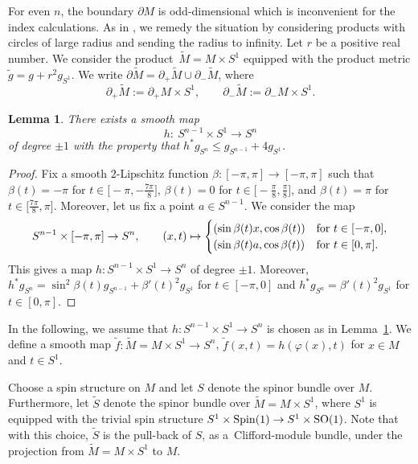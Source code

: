 \documentclass[11pt]{article}
\numberwithin{equation}{section}
\numberwithin{equation}{section}
\newtheorem{Lemma}[Theorem]{Lemma}
\begin{document}
For even $n$, the boundary $\partial M$ is odd-dimensional which is inconvenient for the index calculations.
As in \cite{Llarull}, we remedy the situation by considering products with circles of large radius and sending the radius to infinity.
Let $r$ be a positive real number. We consider the product~${\tilde{M} = M \times S^1}$ equipped with the product metric $\tilde{g} = g + r^2 g_{S^1}$. We write $\partial \tilde{M} = \partial_+ \tilde{M} \cup \partial_- \tilde{M}$, where
\[\partial_+ \tilde{M} := \partial_+ M \times S^1, \qquad \partial_- \tilde{M} := \partial_- M \times S^1.\]

\begin{Lemma} \label{map_to_Sn}
There exists a smooth map
\begin{equation*}
 h\colon\ S^{n-1} \times S^1 \to S^n
\end{equation*}
of degree $\pm 1$ with the property that $h^* g_{S^n} \leq g_{S^{n-1}} + 4 g_{S^1}$.
\end{Lemma}

\begin{proof}
Fix a smooth $2$-Lipschitz function $\beta\colon [-\pi,\pi] \to [-\pi,\pi]$ such that $\beta(t) = -\pi$ for $t \in \bigl[-\pi,-\frac{7\pi}{8}\bigr]$, $\beta(t) = 0$ for $t \in \bigl[-\frac{\pi}{8},\frac{\pi}{8}\bigr]$, and $\beta(t) = \pi$ for $t \in \big[\frac{7\pi}{8},\pi\big]$. Moreover, let us fix a point $a \in S^{n-1}$. We consider the map
\[
 S^{n-1} \times [-\pi,\pi] \to S^n,\qquad (x,t) \mapsto \begin{cases} (\sin \beta(t) x,\cos \beta(t)) & \text{\rm for $t \in [-\pi,0]$}, \\
 (\sin \beta(t) a,\cos \beta(t)) & \text{\rm for $t \in [0,\pi]$.} \end{cases}
 \]
This gives a map $h\colon S^{n-1} \times S^1 \to S^n$ of degree $\pm 1$. Moreover, $h^* g_{S^n} = \sin^2 \beta(t) g_{S^{n-1}} + \beta'(t)^2 g_{S^1}$ for $t \in [-\pi,0]$ and $h^* g_{S^n} = \beta'(t)^2 g_{S^1}$ for $t \in [0,\pi]$.
\end{proof}

In the following, we assume that $h\colon S^{n-1} \times S^1 \to S^n$ is chosen as in Lemma~\ref{map_to_Sn}. We define a smooth map $\tilde{f}\colon \tilde{M} = M \times S^1\to S^n$, $
\tilde{f}(x,t) = h(\varphi(x),t)$ for $x \in M$ and $t \in S^1$.

Choose a spin structure on $M$ and let $S$ denote the spinor bundle over $M$. Furthermore, let $\tilde{S}$ denote the spinor bundle over $\tilde{M} = M \times S^1$, where $S^1$ is equipped with the trivial spin structure $S^1 \times {\rm Spin}(1) \to S^1 \times {\rm SO}(1)$.
Note that with this choice, $\tilde{S}$ is the pull-back of $S$, as a~Clifford-module bundle, under the projection from $\tilde{M} = M \times S^1$ to $M$.
\end{document}
